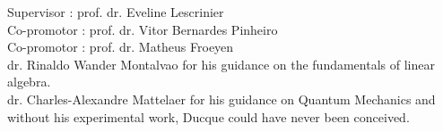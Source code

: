\pagebreak
\hspace{0pt}
\vfill
\begin{center}
Supervisor : prof. dr. Eveline Lescrinier\\
Co-promotor : prof. dr. Vitor Bernardes Pinheiro\\
Co-promotor : prof. dr. Matheus Froeyen\\
\vspace{3mm}
dr. Rinaldo Wander Montalvao for his guidance on the fundamentals of linear algebra.\\
dr. Charles-Alexandre Mattelaer for his guidance on Quantum Mechanics and without his
experimental work, Ducque could have never been conceived.
\end{center}
\vfill
\hspace{0pt}
